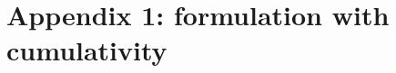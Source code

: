 \documentclass[11pt,a4paper]{article}
\theoremstyle{definition}
\newcommand{\NN}{\mathsf{N}}
\newcommand{\UU}{\mathsf{U}}
\newcommand{\mylam}[3]{\lambda_{#1:#2}#3}
\newcommand{\mypi}[3]{\Pi_{#1:#2}#3}
\newcommand{\mysig}[3]{\Sigma_{#1:#2}#3}
\newcommand{\T}{\mathsf{T}}
\begin{document}



\newpage

\section*{Appendix 1: formulation with cumulativity}


\end{document}
